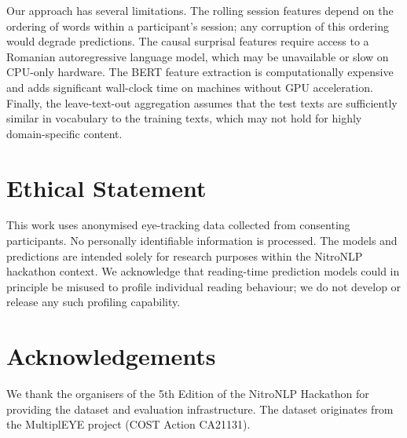 \documentclass[12pt]{article}
\begin{document}
Our approach has several limitations. The rolling session features depend on the ordering of words within a participant's session; any corruption of this ordering would degrade predictions. The causal surprisal features require access to a Romanian autoregressive language model, which may be unavailable or slow on CPU-only hardware. The BERT feature extraction is computationally expensive and adds significant wall-clock time on machines without GPU acceleration. Finally, the leave-text-out aggregation assumes that the test texts are sufficiently similar in vocabulary to the training texts, which may not hold for highly domain-specific content.

\section{Ethical Statement}

This work uses anonymised eye-tracking data collected from consenting participants. No personally identifiable information is processed. The models and predictions are intended solely for research purposes within the NitroNLP hackathon context. We acknowledge that reading-time prediction models could in principle be misused to profile individual reading behaviour; we do not develop or release any such profiling capability.

\section{Acknowledgements}

We thank the organisers of the 5th Edition of the NitroNLP Hackathon for providing the dataset and evaluation infrastructure. The dataset originates from the MultiplEYE project (COST Action CA21131).
\end{document}
